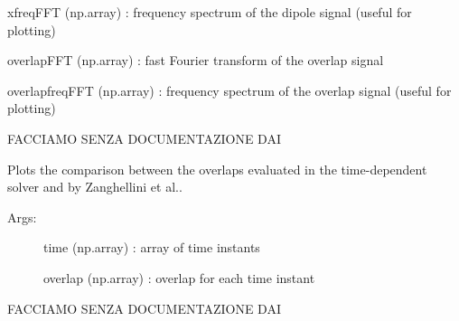 \documentclass[letterpaper,10pt,english]{sphinxmanual}
\begin{document}
\begin{fulllineitems}
\begin{fulllineitems}
\begin{description}
xfreqFFT (np.array) : frequency spectrum of the dipole signal (useful for plotting)

overlapFFT (np.array) : fast Fourier transform of the overlap signal

overlapfreqFFT (np.array) : frequency spectrum of the overlap signal (useful for plotting)

\end{description}

\end{fulllineitems}


\begin{fulllineitems}
\label{\detokenize{index:do.GHF.plot_onebody_comparison}}
FACCIAMO SENZA DOCUMENTAZIONE DAI

\end{fulllineitems}


\begin{fulllineitems}
\label{\detokenize{index:do.GHF.plot_overlap}}
Plots the comparison between the overlaps evaluated in the time-dependent solver and by Zanghellini et al..
\begin{description}
\item[{Args:}] \leavevmode
time (np.array) : array of time instants

overlap (np.array) : overlap for each time instant

\end{description}

\end{fulllineitems}


\begin{fulllineitems}
\label{\detokenize{index:do.GHF.plot_overlaps}}
FACCIAMO SENZA DOCUMENTAZIONE DAI


\end{fulllineitems}
\end{fulllineitems}
\end{document}
